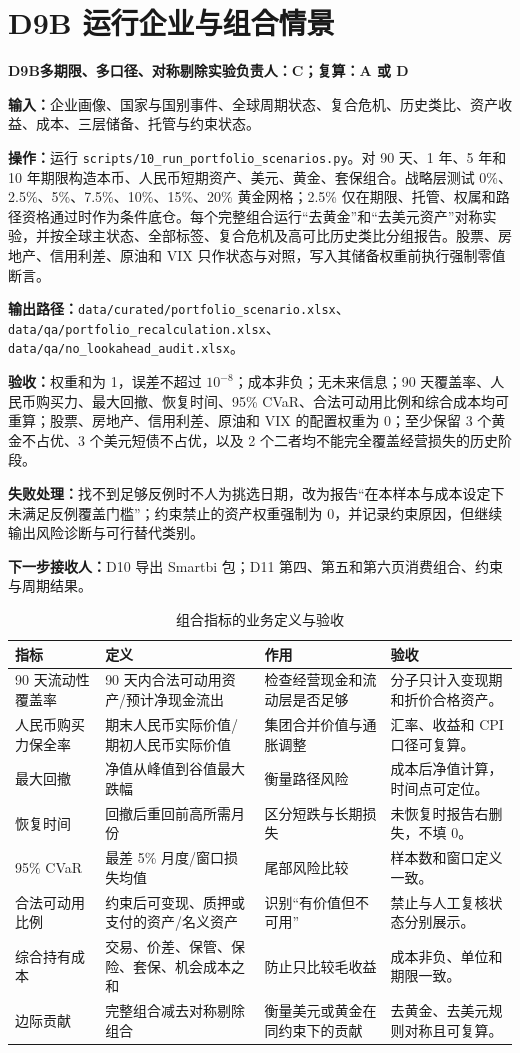 \documentclass[UTF8,fontset=windows,12pt,openany]{ctexbook}
\newcommand{\File}[1]{{\small\begingroup\urlstyle{same}\nolinkurl{#1}\endgroup}}
\newcommand{\StepTitle}[3]{%
  \noindent\colorbox{DeepNavy}{\parbox{0.965\textwidth}{\color{white}\Large\bfseries #1\quad #2\hfill\normalsize #3}}\par\medskip
}
\newcommand{\CardRow}[2]{\noindent\textbf{#1：}#2\par}
\begin{document}
\section{D9B 运行企业与组合情景}
\StepTitle{D9B}{多期限、多口径、对称剔除实验}{负责人：C；复算：A 或 D}
\CardRow{输入}{企业画像、国家与国别事件、全球周期状态、复合危机、历史类比、资产收益、成本、三层储备、托管与约束状态。}
\CardRow{操作}{运行 \File{scripts/10_run_portfolio_scenarios.py}。对 90 天、1 年、5 年和 10 年期限构造本币、人民币短期资产、美元、黄金、套保组合。战略层测试 0\%、2.5\%、5\%、7.5\%、10\%、15\%、20\% 黄金网格；2.5\% 仅在期限、托管、权属和路径资格通过时作为条件底仓。每个完整组合运行“去黄金”和“去美元资产”对称实验，并按全球主状态、全部标签、复合危机及高可比历史类比分组报告。股票、房地产、信用利差、原油和 VIX 只作状态与对照，写入其储备权重前执行强制零值断言。}
\CardRow{输出路径}{\File{data/curated/portfolio_scenario.xlsx}、\File{data/qa/portfolio_recalculation.xlsx}、\File{data/qa/no_lookahead_audit.xlsx}。}
\CardRow{验收}{权重和为 1，误差不超过 \(10^{-8}\)；成本非负；无未来信息；90 天覆盖率、人民币购买力、最大回撤、恢复时间、95\% CVaR、合法可动用比例和综合成本均可重算；股票、房地产、信用利差、原油和 VIX 的配置权重为 0；至少保留 3 个黄金不占优、3 个美元短债不占优，以及 2 个二者均不能完全覆盖经营损失的历史阶段。}
\CardRow{失败处理}{找不到足够反例时不人为挑选日期，改为报告“在本样本与成本设定下未满足反例覆盖门槛”；约束禁止的资产权重强制为 0，并记录约束原因，但继续输出风险诊断与可行替代类别。}
\CardRow{下一步接收人}{D10 导出 Smartbi 包；D11 第四、第五和第六页消费组合、约束与周期结果。}

\begin{longtable}{p{3.2cm}p{3.1cm}p{3.2cm}p{3.7cm}}
\caption{组合指标的业务定义与验收}\label{tab:portfolio-metrics}\\
\toprule
\textbf{指标} & \textbf{定义} & \textbf{作用} & \textbf{验收}\\
\midrule
90 天流动性覆盖率 & 90 天内合法可动用资产/预计净现金流出 & 检查经营现金和流动层是否足够 & 分子只计入变现期和折价合格资产。\\
人民币购买力保全率 & 期末人民币实际价值/期初人民币实际价值 & 集团合并价值与通胀调整 & 汇率、收益和 CPI 口径可复算。\\
最大回撤 & 净值从峰值到谷值最大跌幅 & 衡量路径风险 & 成本后净值计算，时间点可定位。\\
恢复时间 & 回撤后重回前高所需月份 & 区分短跌与长期损失 & 未恢复时报告右删失，不填 0。\\
95\% CVaR & 最差 5\% 月度/窗口损失均值 & 尾部风险比较 & 样本数和窗口定义一致。\\
合法可动用比例 & 约束后可变现、质押或支付的资产/名义资产 & 识别“有价值但不可用” & 禁止与人工复核状态分别展示。\\
综合持有成本 & 交易、价差、保管、保险、套保、机会成本之和 & 防止只比较毛收益 & 成本非负、单位和期限一致。\\
边际贡献 & 完整组合减去对称剔除组合 & 衡量美元或黄金在同约束下的贡献 & 去黄金、去美元规则对称且可复算。\\
\bottomrule
\end{longtable}
\end{document}
